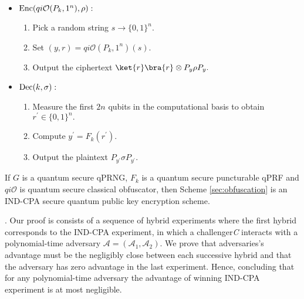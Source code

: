 \begin{itemize}
\item ${\rm Enc}(qi\mathcal{O}(P_k,1^n), \rho):$
\begin{enumerate}
\item Pick a random string $s\rightarrow \{0,1\}^n.$
\item Set $(y,r)=qi\mathcal{O}(P_k,1^n)(s).$
\item  Output the ciphertext $\ket{r}\bra{r} \otimes P_y \rho P_y.$
\end{enumerate}
\end{itemize}

\begin{itemize}
\item ${\rm Dec}(k, \sigma):$
\begin{enumerate}
\item Measure the first $2n$ qubits in the computational basis to obtain $r^\prime \in \{0,1\}^n.$
\item Compute $y^\prime=F_k(r^\prime).$
\item Output the plaintext $P_{y^\prime}\sigma P_{y^\prime}.$
\end{enumerate}
\end{itemize}

\begin{theorem}
If $G$ is a quantum secure qPRNG, $F_k$ is a quantum secure puncturable qPRF  and $qi\mathcal{O}$ is quantum secure classical obfuscator, then Scheme \ref{sec:obfuscation} is an IND-CPA secure
 quantum public key encryption scheme.
\end{theorem}

. Our proof is consists of a sequence of hybrid experiments where the first hybrid corresponds to the
IND-CPA experiment, in which a challenger{\em C} interacts with a polynomial-time adversary $\mathcal{A}=(\mathcal{A}_1, \mathcal{A}_2).$ We prove that adversaries's advantage must be the negligibly close between each successive hybrid and that the adversary has zero advantage in the last experiment. Hence, concluding that for any polynomial-time adversary the advantage of winning IND-CPA  experiment is at most negligible.

